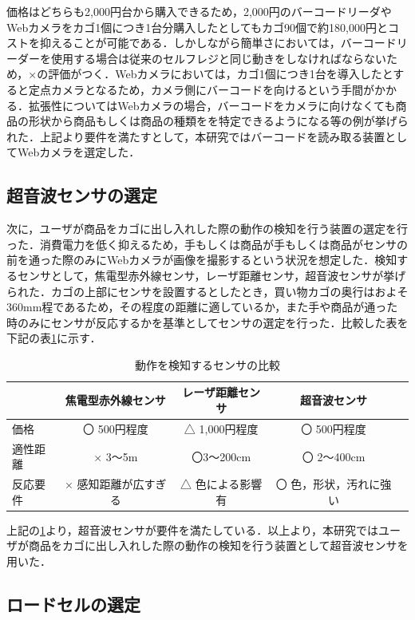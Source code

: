 価格はどちらも2,000円台から購入できるため，2,000円のバーコードリーダやWebカメラをカゴ1個につき1台分購入したとしてもカゴ90個で約180,000円とコストを抑えることが可能である．しかしながら簡単さにおいては，バーコードリーダーを使用する場合は従来のセルフレジと同じ動きをしなければならないため，×の評価がつく．Webカメラにおいては，カゴ1個につき1台を導入したとすると定点カメラとなるため，カメラ側にバーコードを向けるという手間がかかる．拡張性についてはWebカメラの場合，バーコードをカメラに向けなくても商品の形状から商品もしくは商品の種類をを特定できるようになる等の例が挙げられた．上記より要件を満たすとして，本研究ではバーコードを読み取る装置としてWebカメラを選定した．


\subsection{超音波センサの選定}


次に，ユーザが商品をカゴに出し入れした際の動作の検知を行う装置の選定を行った．消費電力を低く抑えるため，手もしくは商品が手もしくは商品がセンサの前を通った際のみにWebカメラが画像を撮影するという状況を想定した．検知するセンサとして，焦電型赤外線センサ，レーザ距離センサ，超音波センサが挙げられた．カゴの上部にセンサを設置するとしたとき，買い物カゴの奥行はおよそ360mm程であるため，その程度の距離に適しているか，また手や商品が通った時のみにセンサが反応するかを基準としてセンサの選定を行った．比較した表を下記の表\ref{kyori}に示す．


\begin{table}[htb]
\begin{center}
\caption{動作を検知するセンサの比較}
\begin{tabular}{|l|c|c|c|c|} \hline
 & 焦電型赤外線センサ & レーザ距離センサ & 超音波センサ \\ \hline \hline
価格 & 〇 500円程度 & △ 1,000円程度 & 〇 500円程度 \\
適性距離 & × 3～5m & 〇3～200cm & 〇 2～400cm \\ 
反応要件 & × 感知距離が広すぎる & △ 色による影響有 & 〇 色，形状，汚れに強い \\ \hline
\end{tabular}
\label{kyori}
\end{center}
\end{table}

上記の\ref{kyori}より，超音波センサが要件を満たしている．以上より，本研究ではユーザが商品をカゴに出し入れした際の動作の検知を行う装置として超音波センサを用いた．


\subsection{ロードセルの選定}

